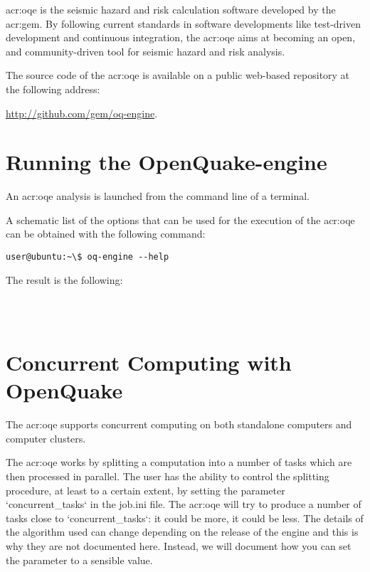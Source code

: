 \glsdesc{acr:oqe} is the seismic hazard and risk calculation software developed by
the \glsdesc{acr:gem}. By following current standards in software
developments like test-driven development and continuous integration, the
\glsdesc{acr:oqe} aims at becoming an open, and community-driven tool for
seismic hazard and risk analysis.

The source code of the \glsdesc{acr:oqe} is available on a public web-based
repository at the following address:

\href{http://github.com/gem/oq-engine}{http://github.com/gem/oq-engine}.


\section{Running the OpenQuake-engine}
\label{sec:running_oq_engine}

An \gls{acr:oqe} analysis is launched from the command line of a terminal.

A schematic list of the options that can be used for the execution of the
\gls{acr:oqe} can be obtained with the following command:

\begin{verbatim}
user@ubuntu:~\$ oq-engine --help
\end{verbatim}

The result is the following:

\inputminted[firstline=1,fontsize=\footnotesize,frame=single]{shell-session}{oqum/help.txt}\\

\section{Concurrent Computing with OpenQuake}
\label{sec:concurrent_tasks}

The \glsdesc{acr:oqe} supports concurrent computing on both standalone
computers and computer clusters.

The \glsdesc{acr:oqe} works by splitting a computation into a number of tasks
which are then processed in parallel. The user has the ability to control the
splitting procedure, at least to a certain extent, by setting the parameter
`concurrent\_tasks` in the job.ini file. The \glsdesc{acr:oqe} will try to
produce a number of tasks close to `concurrent\_tasks`: it could be more, it
could be less. The details of the algorithm used can change depending on the
release of the engine and this is why they are not documented here. Instead,
we will document how you can set the parameter to a sensible value.

